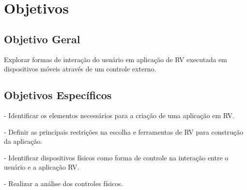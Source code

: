 \section{Objetivos}
\label{c.objetivos}

\subsection{Objetivo Geral}
\label{s.geral}
Explorar formas de interação do usuário em aplicação de RV executada em dispositivos móveis através de um controle externo.

\subsection{Objetivos Específicos}
\label{s.especifico}
- Identificar os elementos necessários para a criação de uma aplicação em RV.

- Definir as principais restrições na escolha e ferramentas de RV para construção da aplicação.

- Identificar dispositivos físicos como forma de controle na interação entre o usuário e a aplicação RV.

- Realizar a análise dos controles físicos.



